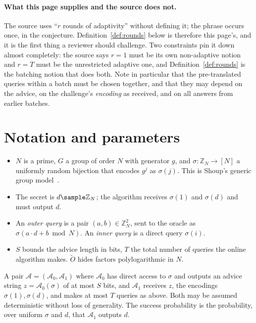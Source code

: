 \documentclass{conjura-conjecture}
\newcommand{\Adv}{\mathcal{A}}
\newcommand{\Z}{\mathbb{Z}}
\newcommand{\Ot}{\widetilde{O}}
\begin{document}
\paragraph{What this page supplies and the source does not.}
The source uses ``$r$ rounds of adaptivity'' without defining it; the
phrase occurs once, in the conjecture. Definition~\ref{def:rounds}
below is therefore this page's, and it is the first thing a reviewer
should challenge. Two constraints pin it down almost completely: the
source says $r = 1$ must be its own non-adaptive notion and $r = T$
must be the unrestricted adaptive one, and Definition~\ref{def:rounds}
is the batching notion that does both. Note in particular that the
pre-translated queries within a batch must be chosen together, and that
they may depend on the advice, on the challenge's \emph{encoding} as
received, and on all answers from earlier batches.

\section{Notation and parameters}\label{sec:notation}

\begin{itemize}[nosep]
  \item $N$ is a prime, $G$ a group of order $N$ with generator $g$,
    and $\sigma : \Z_{N} \to [N]$ a uniformly random bijection that
    encodes $g^{j}$ as $\sigma(j)$. This is Shoup's generic group
    model~\cite{Sho97}.
  \item The secret is $d \sample \Z_{N}$; the algorithm receives
    $\sigma(1)$ and $\sigma(d)$ and must output $d$.
  \item An \emph{outer query} is a pair $(a,b) \in \Z_{N}^{2}$, sent to
    the oracle as $\sigma(a \cdot d + b \bmod N)$. An \emph{inner
    query} is a direct query $\sigma(i)$.
  \item $S$ bounds the advice length in bits, $T$ the total number of
    queries the online algorithm makes. $\Ot$ hides factors
    polylogarithmic in $N$.
\end{itemize}

\begin{definition}\label{def:st}
A pair $\Adv = (\Adv_{0}, \Adv_{1})$ where $\Adv_{0}$ has direct access
to $\sigma$ and outputs an advice string $z = \Adv_{0}(\sigma)$ of at
most $S$ bits, and $\Adv_{1}$ receives $z$, the encodings
$\sigma(1), \sigma(d)$, and makes at most $T$ queries as above. Both
may be assumed deterministic without loss of generality. The success
probability is the probability, over uniform $\sigma$ and $d$, that
$\Adv_{1}$ outputs $d$.
\end{definition}
\end{document}
